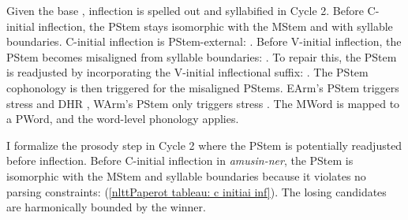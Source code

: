 Given the base \textit{}, inflection is spelled out and syllabified in Cycle 2. 
Before C-initial inflection, the PStem stays isomorphic with the MStem and with syllable boundaries. C-initial inflection is PStem-external: \textit{}. Before V-initial inflection, the PStem becomes misaligned from syllable boundaries: \textit{}. To repair this, the PStem is readjusted by incorporating the V-initial inflectional suffix: \textit{}. The PStem cophonology is then triggered for the misaligned PStems. EArm's PStem triggers stress and DHR \textit{}, WArm's PStem only triggers stress \textit{}. The MWord is mapped to a PWord, and the word-level phonology applies.%











I formalize the prosody step in Cycle 2 where the PStem is potentially readjusted before inflection. Before C-initial inflection in \textit{amusin-ner}, the PStem is isomorphic with the MStem and syllable boundaries because it violates no parsing constraints: \textit{} (\ref{nlttPaperot tableau: c initiai inf}). The losing candidates are harmonically bounded by the winner.



